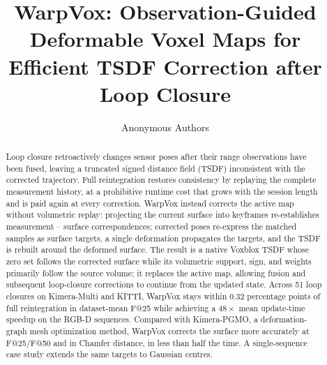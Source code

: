 \documentclass[letterpaper,10pt,conference]{ieeeconf}
\title{WarpVox: Observation-Guided Deformable Voxel Maps for Efficient TSDF Correction after Loop Closure}
\author{Anonymous Authors}
\begin{document}
\maketitle
\thispagestyle{empty}
\pagestyle{empty}

\begin{abstract}
Loop closure retroactively changes sensor poses after their range observations have been fused, leaving a truncated signed distance field (TSDF) inconsistent with the corrected trajectory. Full reintegration restores consistency by replaying the complete measurement history, at a prohibitive runtime cost that grows with the session length and is paid again at every correction. 
WarpVox instead corrects the active map without volumetric replay: projecting the current surface into keyframes re-establishes measurement -- surface correspondences; corrected poses re-express the matched samples as surface targets, a single deformation propagates the targets, and the TSDF is rebuilt around the deformed surface.
The result is a native Voxblox TSDF whose zero set follows the corrected surface while its volumetric support, sign, and weights primarily follow the source volume; it replaces the active map, allowing fusion and subsequent loop-closure corrections to continue from the updated state. 
Across 51 loop closures on Kimera-Multi and KITTI, WarpVox stays within 0.32 percentage points of full reintegration in dataset-mean F@25 while achieving a $48\times$ mean update-time speedup on the RGB-D sequences. Compared with Kimera-PGMO, a deformation-graph mesh optimization method, WarpVox corrects the surface more accurately at F@25/F@50 and in Chamfer distance, in less than half the time.
A single-sequence case study extends the same targets to Gaussian centres.

\end{abstract}
\end{document}
